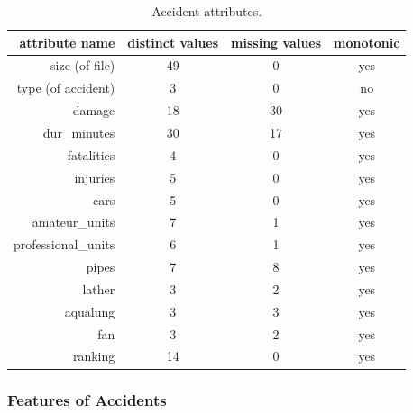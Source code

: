 \begin{table}
\centering
\begin{tabular}{|r||c|c|c|}
\hline
\textbf{attribute name} & \textbf{distinct values} & \textbf{missing values} & \textbf{monotonic}\\
\hline
\hline
size (of file) & 49 & 0 & yes\\
\hline
type (of accident) & 3 & 0 & no\\
\hline
damage & 18 & 30 & yes\\
\hline
dur\_minutes & 30 & 17 & yes\\
\hline
fatalities & 4 & 0 & yes\\
\hline
injuries & 5 & 0 & yes\\
\hline
cars & 5 & 0 & yes\\
\hline
amateur\_units & 7 & 1 & yes\\
\hline
professional\_units & 6 & 1 & yes\\
\hline
pipes & 7 & 8 & yes\\
\hline
lather & 3 & 2 & yes\\
\hline
aqualung & 3 & 3 & yes\\
\hline
fan & 3 & 2 & yes\\
\hline
ranking & 14 & 0 & yes\\
\hline
\end{tabular}

\caption{Accident attributes.}
\label{fig:data_attributes_description}
\end{table}


\subsubsection{Features of Accidents} \label{sec:data_features}


